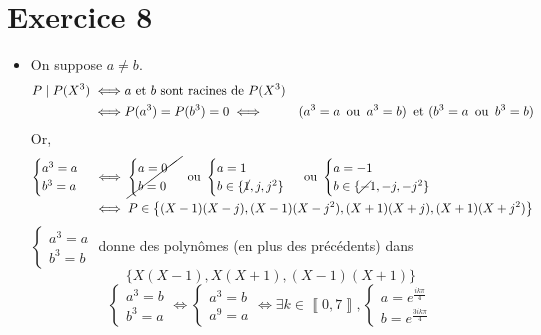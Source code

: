 \part{Exercice 8}

\begin{itemize}
	\item On suppose $a \neq b$.
		\begin{align*}
			P  \mid P(X^3) \iff& \text{$a$ et $b$ sont racines de $P(X^3)$}\\
			\iff& P(a^3) = P(b^3) = 0
			\iff& (a^3 = a \operatorname{\text{ ou }} a^3=b)\operatorname{\text{ et }}(b^3=a \operatorname{\text{ ou }} b^3=b)
		\end{align*}
		Or,
		\begin{align*}
			\begin{cases}
				a^3=a\\
				b^3=a
			\end{cases} &\iff \cancel{\begin{cases}
				a = 0\\
				b = 0\\
			\end{cases}} \operatorname{\text{ ou }} \begin{cases}
				a = 1\\
				b \in \{\cancel1, j, j^2\}
			\end{cases} \operatorname{\text{ ou }} \begin{cases}
				a = -1\\
				b \in \{\cancel-1, -j, -j^2\}
			\end{cases}\\
			&\iff P \in \big\{ (X-1)(X-j), (X-1)(X-j^2), (X+1)(X+j), (X+1)(X+j^2) \big\}\\
		\end{align*}
		$\begin{cases}
			a^3 = a\\
			b^3 = b
		\end{cases}$ donne des polynômes (en plus des précédents) dans \[
			\big\{ X(X-1), X(X+1), (X-1)(X+1) \big\}
		\]
		\[
			\begin{cases}
				a^3 = b\\
				b^3 = a
			\end{cases} \iff \begin{cases}
				a^3 = b\\
				a^9 = a
			\end{cases} \iff \exists k \in \left\llbracket 0, 7 \right\rrbracket, \begin{cases}
				a = e^{\frac{ik\pi}{4}}\\
				b = e^{\frac{3ik\pi}{4}}
			\end{cases}
\]
\end{itemize}

